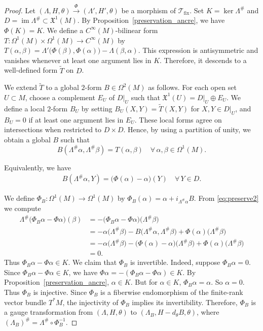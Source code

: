 \documentclass[11pt,a4paper]{article}
\theoremstyle{plain}
\theoremstyle{definition}
\theoremstyle{remark}
\begin{document}
\begin{proof}
	Let $(\Lambda,H,\theta)\xrightarrow{\Phi}(\Lambda',H',\theta)$ be a morphism of $\mathcal{T}_{\mathrm{fix}}$.
	Set $K=\ker\Lambda^\#$ and $D=\operatorname{im}\Lambda^\#\subset\mathfrak{X}^1(M)$. By Proposition~\ref{preservation_ancre},
	we have $\Phi(K)=K$.	
	We define a $C^\infty(M)$-bilinear form $T:\Omega^1(M)\times\Omega^1(M)\to C^\infty(M)$ by
	$
	T(\alpha,\beta)=\Lambda'\bigl(\Phi(\beta),\Phi(\alpha)\bigr)-\Lambda(\beta,\alpha).
	$
	This expression is antisymmetric and vanishes whenever at least one argument lies in $K$.
	Therefore, it descends to a well-defined form $\widetilde{T}$ on $D$.
	
	We extend $\widetilde{T}$ to a global $2$-form $B\in\Omega^2(M)$ as follows.
	For each open set $U\subset M$, choose a complement $E_U$ of $D|_U$ such that
	$\mathfrak{X}^1(U)=D|_U\oplus E_U$. We define a local $2$-form $B_U$ by setting
	$B_U(X,Y)=\widetilde{T}(X,Y)$ for $X,Y\in D|_U$, and $B_U=0$ if at least one argument lies in $E_U$.
	These local forms agree on intersections when restricted to $D\times D$.
	Hence, by using a partition of unity, we obtain a global $B$ such that
	$$
	B(\Lambda^\#\alpha,\Lambda^\#\beta)=T(\alpha,\beta)
	\quad \forall\,\alpha,\beta\in\Omega^1(M).
	$$
	
	Equivalently, we have
	\begin{align}\label{eq:preserve2}
		B(\Lambda^\#\alpha,Y)=\Big(\Phi(\alpha)-\alpha\Big)(Y)
		\quad \forall\,Y\in D.
	\end{align}
	
	We define $\Phi_B:\Omega^1(M)\to\Omega^1(M)$ by
	$\Phi_B(\alpha)=\alpha+i_{\Lambda^\#\alpha}B$. From \eqref{eq:preserve2} we compute
	\begin{align*}
		\Lambda^\#\bigl(\Phi_B\alpha-\Phi\alpha\bigr)(\beta)
		&= -\bigl(\Phi_B\alpha-\Phi\alpha\bigr)\bigl(\Lambda^\#\beta\bigr) \\
		&= -\alpha\bigl(\Lambda^\#\beta\bigr)-B\bigl(\Lambda^\#\alpha,\Lambda^\#\beta\bigr)+\Phi(\alpha)\bigl(\Lambda^\#\beta\bigr) \\
		&= -\alpha\bigl(\Lambda^\#\beta\bigr)-\bigl(\Phi(\alpha)-\alpha\bigr)\bigl(\Lambda^\#\beta\bigr)+\Phi(\alpha)\bigl(\Lambda^\#\beta\bigr) \\
		&= 0.
	\end{align*}
	Thus $\Phi_B\alpha-\Phi\alpha\in K$.  We claim that $\Phi_B$ is invertible.
Indeed, suppose $\Phi_B\alpha=0$. Since $\Phi_B\alpha-\Phi\alpha\in K$, we have $\Phi\alpha=-(\Phi_B\alpha-\Phi\alpha)\in K$.
  By Proposition~\ref{preservation_ancre}, $\alpha\in K$.  But for $\alpha\in K$,  $\Phi_B\alpha=\alpha$. So $\alpha=0$. Thus $\Phi_B$ is injective. Since $\Phi_B$ is a fiberwise endomorphism of the finite-rank vector bundle $T^*M$, the  injectivity of $\Phi_B$ implies its invertibility.
	Therefore, $\Phi_B$ is a gauge transformation from $(\Lambda,H,\theta)$ to
	$(\Lambda_B,H-d_\theta B,\theta)$, where $(\Lambda_B)^\#=\Lambda^\#\circ \Phi_B^{-1}$.
	

\end{proof}
\end{document}
